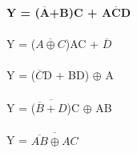\documentclass[a4paper, 100pt]{scrartcl}
\begin{document}
	
	\textbf{Y = ($\overline{\textbf{A}}$+B)C + $\overline{\textbf{ACD}}$} 
	\\
	\\
	Y = ($\overline{A \oplus C}$)AC + $\overline{D}$ 
	\\
	\\
	Y = ($\overline{C}$D + BD) $\oplus$ A
	\\
	\\
	Y = ($\overline{\overline{B}+D}$)C $\oplus$ AB
	\\
	\\
	Y = $\overline{\overline{AB}\oplus AC}$
\end{document}
